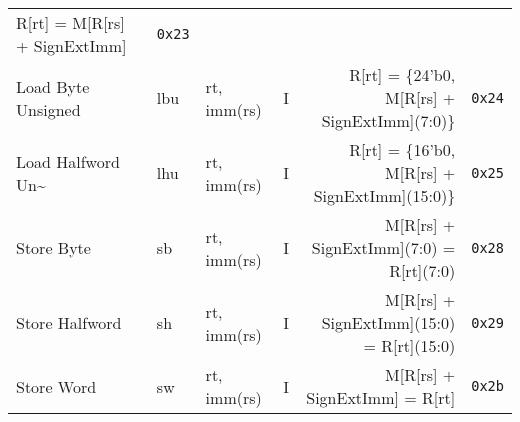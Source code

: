 \begin{tabularx}{\textwidth}{lMAcDr}
    R[rt] = M[R[rs] + SignExtImm]                  \footnotemark[2]                 & \texttt{0x23}                       \\
    Load Byte Unsigned                                                              & lbu    & rt, imm(rs)   & I &
    R[rt] = \{24'b0, M[R[rs] + SignExtImm](7:0)\}  \footnotemark[2]                 & \texttt{0x24}                       \\
    Load Halfword Un\textasciitilde{}                                                          & lhu    & rt, imm(rs)   & I &
    R[rt] = \{16'b0, M[R[rs] + SignExtImm](15:0)\} \footnotemark[2]                 & \texttt{0x25}                       \\
    Store Byte                                                                      & sb     & rt, imm(rs)   & I &
    M[R[rs] + SignExtImm](7:0) = R[rt](7:0)        \footnotemark[2]                 & \texttt{0x28}                       \\
    Store Halfword                                                                  & sh     & rt, imm(rs)   & I &
    M[R[rs] + SignExtImm](15:0) = R[rt](15:0)      \footnotemark[2]                 & \texttt{0x29}                       \\
    Store Word                                                                      & sw     & rt, imm(rs)   & I &
    M[R[rs] + SignExtImm] = R[rt]                  \footnotemark[2]                 & \texttt{0x2b}                       \\
    \bottomrule
\end{tabularx}

